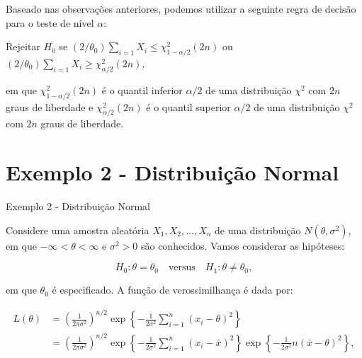 \documentclass[12pt]{beamer}
\begin{document}
\begin{frame}{}
\begin{block}{}
\justifying
Baseado nas observações anteriores, podemos utilizar a seguinte regra de decisão para o teste de nível $\alpha$:
\end{block}
\pause
\begin{block}{}
\justifying
Rejeitar $H_0$ se $(2/\theta_0) \sum_{i=1} X_i \leq \chi^2_{1-\alpha/2}(2n)$ ou $(2/\theta_0) \sum_{i=1} X_i \geq \chi^2_{\alpha/2}(2n),$
\end{block}
\begin{block}{}
\justifying
em que $\chi^2_{1-\alpha/2}(2n)$ é o quantil inferior $\alpha/2$ de uma distribuição $\chi^2$ com $2n$ graus de liberdade e $\chi^2_{\alpha/2}(2n)$ é o quantil superior $\alpha/2$ de uma distribuição $\chi^2$ com $2n$ graus de liberdade.
\end{block}
\end{frame}

\section{Exemplo 2 - Distribuição Normal}
\begin{frame}{Exemplo 2 - Distribuição Normal}
\begin{block}{}
\justifying
Considere uma amostra aleatória $X_1, X_2, \ldots, X_n$ de uma distribuição $N(\theta, \sigma^2)$, em que $-\infty < \theta < \infty$ e $\sigma^2 > 0$ são conhecidos. Vamos considerar as hipóteses:

\[ H_0 : \theta = \theta_0 \quad \text{versus} \quad H_1 : \theta \neq \theta_0, \]

em que $\theta_0$ é especificado. A função de verossimilhança é dada por:

\[
\begin{aligned}
L(\theta) &= \left(\frac{1}{2\pi\sigma^2}\right)^{n/2} \exp\left\{ -\frac{1}{2\sigma^2} \sum_{i=1}^{n}(x_i - \theta)^2 \right\} \\
&= \left(\frac{1}{2\pi\sigma^2}\right)^{n/2} \exp\left\{ -\frac{1}{2\sigma^2} \sum_{i=1}^{n}(x_i - \bar{x})^2 \right\} \exp\left\{ -\frac{1}{2\sigma^2}n(\bar{x} - \theta)^2 \right\},
\end{aligned}
\]
\end{block}
\end{frame}
\end{document}
